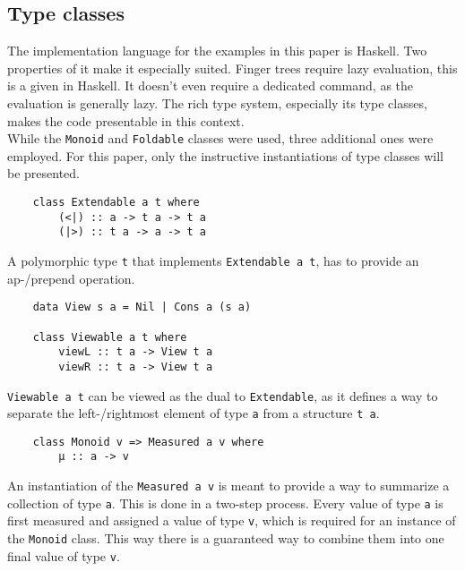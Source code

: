 \subsection{Type classes}

The implementation language for the examples in this paper is Haskell. Two properties of it make it especially suited. Finger trees require lazy evaluation, this is a given in Haskell. It doesn't even require a dedicated command, as the evaluation is generally lazy.
The rich type system, especially its type classes, makes the code presentable in this context.\\
While the \texttt{Monoid} and \texttt{Foldable} classes were used, three additional ones were employed. For this paper, only the instructive instantiations of type classes will be presented.

\begin{verbatim}
    class Extendable a t where
        (<|) :: a -> t a -> t a 
        (|>) :: t a -> a -> t a
\end{verbatim}

A polymorphic type \texttt{t} that implements \texttt{Extendable a t}, has to provide an ap-/prepend operation.

\begin{verbatim}
    data View s a = Nil | Cons a (s a)

    class Viewable a t where
        viewL :: t a -> View t a
        viewR :: t a -> View t a
\end{verbatim}

\texttt{Viewable a t} can be viewed as the dual to \texttt{Extendable}, as it defines a way to separate the left-/rightmost element of type \texttt{a} from a structure \texttt{t a}.

\begin{verbatim}
    class Monoid v => Measured a v where
        μ :: a -> v
\end{verbatim}

An instantiation of the \texttt{Measured a v} is meant to provide a way to summarize a collection of type \texttt{a}. This is done in a two-step process. Every value of type \texttt{a} is first measured and assigned a value of type \texttt{v}, which is required for an instance of the \texttt{Monoid} class. This way there is a guaranteed way to combine them into one final value of type \texttt{v}.

